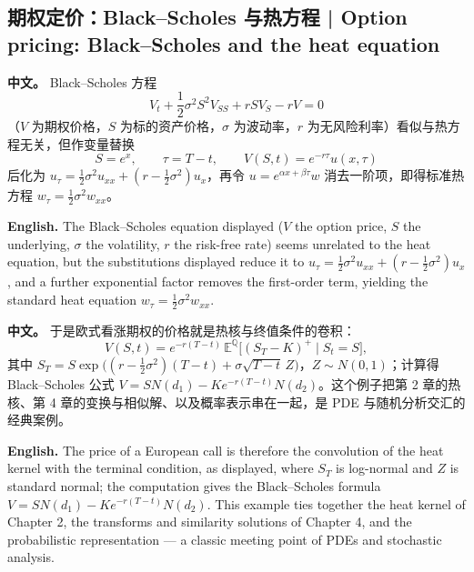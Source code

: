 \documentclass[UTF8,11pt,a4paper]{ctexart}
\newcommand{\APS}[2]{\par\noindent\textbf{中文。} #1\par\noindent\textbf{English.} #2\par\smallskip}
\begin{document}
\subsection{期权定价：Black--Scholes 与热方程 | Option pricing: Black--Scholes and the heat equation}
\APS{Black--Scholes 方程
\[
V_t+\frac12\sigma^2S^2V_{SS}+rSV_S-rV=0
\]
（$V$ 为期权价格，$S$ 为标的资产价格，$\sigma$ 为波动率，$r$ 为无风险利率）看似与热方程无关，但作变量替换
\[
S=e^x,\qquad \tau=T-t,\qquad V(S,t)=e^{-r\tau}u(x,\tau)
\]
后化为 $u_\tau=\frac12\sigma^2u_{xx}+(r-\frac12\sigma^2)u_x$，再令 $u=e^{\alpha x+\beta\tau}w$ 消去一阶项，即得标准热方程 $w_\tau=\frac12\sigma^2w_{xx}$。}{The Black--Scholes equation displayed ($V$ the option price, $S$ the underlying, $\sigma$ the volatility, $r$ the risk-free rate) seems unrelated to the heat equation, but the substitutions displayed reduce it to $u_\tau=\frac12\sigma^2u_{xx}+(r-\frac12\sigma^2)u_x$, and a further exponential factor removes the first-order term, yielding the standard heat equation $w_\tau=\frac12\sigma^2w_{xx}$.}

\APS{于是欧式看涨期权的价格就是热核与终值条件的卷积：
\[
V(S,t)=e^{-r(T-t)}\,\mathbb E^{\mathbb Q}\bigl[(S_T-K)^+\mid S_t=S\bigr],
\]
其中 $S_T=S\exp\bigl((r-\frac12\sigma^2)(T-t)+\sigma\sqrt{T-t}\,Z\bigr)$，$Z\sim N(0,1)$；计算得 Black--Scholes 公式 $V=SN(d_1)-Ke^{-r(T-t)}N(d_2)$。这个例子把第 2 章的热核、第 4 章的变换与相似解、以及概率表示串在一起，是 PDE 与随机分析交汇的经典案例。}{The price of a European call is therefore the convolution of the heat kernel with the terminal condition, as displayed, where $S_T$ is log-normal and $Z$ is standard normal; the computation gives the Black--Scholes formula $V=SN(d_1)-Ke^{-r(T-t)}N(d_2)$. This example ties together the heat kernel of Chapter 2, the transforms and similarity solutions of Chapter 4, and the probabilistic representation — a classic meeting point of PDEs and stochastic analysis.}
\end{document}
